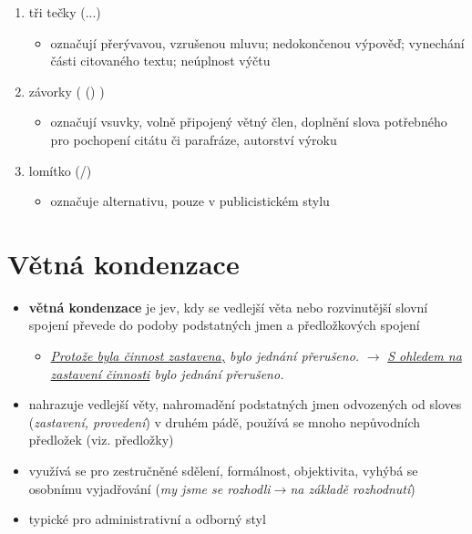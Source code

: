 \documentclass{memoir}
\begin{document}
\begin{enumerate}
\begin{itemize}
		\end{itemize}
		\item tři tečky (...)
		\begin{itemize}
			\item označují přerývavou, vzrušenou mluvu; nedokončenou výpověď; vynechání části citovaného textu; neúplnost výčtu
		\end{itemize}		
		\item závorky ( () )
		\begin{itemize}
			\item označují vsuvky, volně připojený větný člen, doplnění slova potřebného pro pochopení citátu či parafráze, autorství výroku
		\end{itemize}
		\item lomítko (/)
		\begin{itemize}
			\item označuje alternativu, pouze v publicistickém stylu 
		\end{itemize}
	\end{enumerate}

\section*{Větná kondenzace}
	\begin{itemize}
		\item \textbf{větná kondenzace} je jev, kdy se vedlejší věta nebo rozvinutější slovní spojení převede do podoby podstatných jmen a předložkových spojení
		\begin{itemize}
			\item \textit{\underline{Protože byla činnost zastavena,} bylo jednání přerušeno.} $\rightarrow$ \textit{\underline{S ohledem na zastavení činnosti} bylo jednání přerušeno.}
		\end{itemize}
		\item nahrazuje vedlejší věty, nahromadění podstatných jmen odvozených od sloves (\textit{zastavení, provedení}) v druhém pádě, používá se mnoho nepůvodních předložek (viz. předložky)
		\item využívá se pro zestručněné sdělení, formálnost, objektivita, vyhýbá se osobnímu vyjadřování (\textit{my jsme se rozhodli}$\rightarrow$\textit{na základě rozhodnutí})
		\item typické pro administrativní a odborný styl
	\end{itemize}
\end{document}
